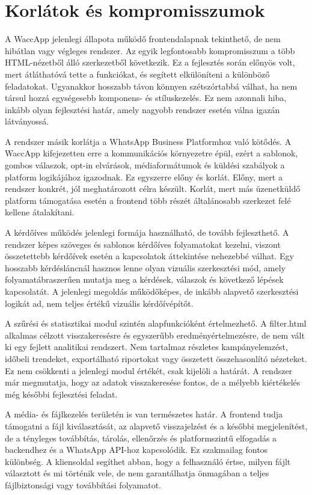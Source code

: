 \section{Korlátok és kompromisszumok}

A WaccApp jelenlegi állapota működő frontendalapnak tekinthető, de nem hibátlan vagy végleges rendszer. Az egyik legfontosabb kompromisszum a több HTML-nézetből álló szerkezetből következik. Ez a fejlesztés során előnyös volt, mert átláthatóvá tette a funkciókat, és segített elkülöníteni a különböző feladatokat. Ugyanakkor hosszabb távon könnyen szétszórtabbá válhat, ha nem társul hozzá egységesebb komponens- és stíluskezelés. Ez nem azonnali hiba, inkább olyan fejlesztési határ, amely nagyobb rendszer esetén válna igazán látványossá.

A rendszer másik korlátja a WhatsApp Business Platformhoz való kötődés. A WaccApp kifejezetten erre a kommunikációs környezetre épül, ezért a sablonok, gombos válaszok, opt-in elvárások, médiaformátumok és küldési szabályok a platform logikájához igazodnak. Ez egyszerre előny és korlát. Előny, mert a rendszer konkrét, jól meghatározott célra készült. Korlát, mert más üzenetküldő platform támogatása esetén a frontend több részét általánosabb szerkezet felé kellene átalakítani.

A kérdőíves működés jelenlegi formája használható, de tovább fejleszthető. A rendszer képes szöveges és sablonos kérdőíves folyamatokat kezelni, viszont összetettebb kérdőívek esetén a kapcsolatok áttekintése nehezebbé válhat. Egy hosszabb kérdésláncnál hasznos lenne olyan vizuális szerkesztési mód, amely folyamatábraszerűen mutatja meg a kérdések, válaszok és következő lépések kapcsolatát. A jelenlegi megoldás működőképes, de inkább alapvető szerkesztési logikát ad, nem teljes értékű vizuális kérdőívépítőt.

A szűrési és statisztikai modul szintén alapfunkcióként értelmezhető. A filter.html alkalmas célzott visszakeresésre és egyszerűbb eredményértelmezésre, de nem vált ki egy fejlett analitikai rendszert. Nem tartalmaz részletes kampányelemzést, időbeli trendeket, exportálható riportokat vagy összetett összehasonlító nézeteket. Ez nem csökkenti a jelenlegi modul értékét, csak kijelöli a határát. A rendszer már megmutatja, hogy az adatok visszakeresése fontos, de a mélyebb kiértékelés még későbbi fejlesztési feladat.

A média- és fájlkezelés területén is van természetes határ. A frontend tudja támogatni a fájl kiválasztását, az alapvető visszajelzést és a későbbi megjelenítést, de a tényleges továbbítás, tárolás, ellenőrzés és platformszintű elfogadás a backendhez és a WhatsApp API-hoz kapcsolódik. Ez szakmailag fontos különbség. A kliensoldal segíthet abban, hogy a felhasználó értse, milyen fájlt választott és mi történik vele, de nem garantálhatja önmagában a teljes fájlbiztonsági vagy továbbítási folyamatot.

